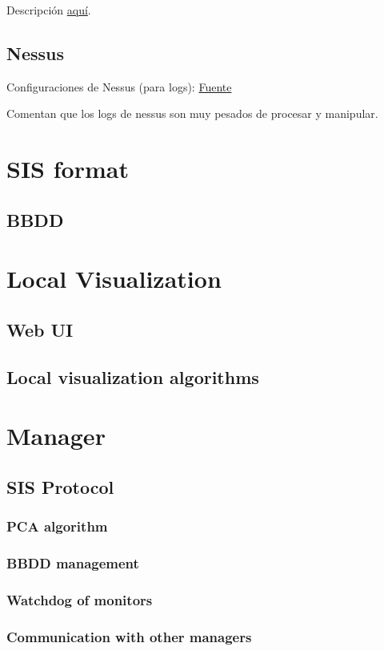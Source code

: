 \documentclass[a4paper,12pt]{article}
\begin{document}
Descripción \href{https://www.manageengine.com/network-monitoring/what-is-snmp.html}{aquí}.

\subsection{Nessus}

Configuraciones de Nessus (para logs): \href{http://wiki.networksecuritytoolkit.org/nstwiki/index.php/Nessus}{Fuente}

Comentan que los logs de nessus son muy pesados de procesar y manipular.

\section{SIS format}



\subsection{BBDD}

\section{Local Visualization}

\subsection{Web UI}

\subsection{Local visualization algorithms}

\section{Manager}

\subsection{SIS Protocol}

\subsubsection{PCA algorithm}

\subsubsection{BBDD management}

\subsubsection{Watchdog of monitors}

\subsubsection{Communication with other managers}
\end{document}
